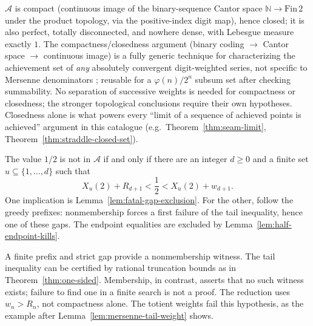 \begin{prop}
\label{prop:achievement-set-topology}
$\ensuremath{\mathcal A}$ is compact (continuous image of the binary-sequence
Cantor space $\mathbb N\to\mathrm{Fin}\,2$ under the product topology, via
the positive-index digit map), hence closed; it is also perfect, totally
disconnected, and nowhere dense, with Lebesgue measure exactly $1$. The
compactness/closedness argument (binary coding $\to$ Cantor space $\to$ continuous image)
is a fully generic technique for characterizing the achievement set of \emph{any}
absolutely convergent digit-weighted series, not specific to Mersenne denominators ;
reusable for a $\varphi(n)/2^n$ subsum set after checking summability.
No separation of successive weights is needed for compactness or
closedness; the stronger topological conclusions require their own
hypotheses. Closedness alone is what powers every ``limit of a sequence of
achieved points is achieved'' argument in this catalogue (e.g.\
Theorem~\ref{thm:seam-limit}, Theorem~\ref{thm:straddle-closed-set}).
\end{prop}

\begin{thm}
\label{thm:master-dichotomy}
The value $1/2$ is not in $\mathcal A$ if and only if there are
an integer $d\ge0$ and a finite set $u\subseteq\{1,\ldots,d\}$
such that
\[
 X_u(2)+R_{d+1}<\frac12<X_u(2)+w_{d+1}.
\]
One implication is Lemma~\ref{lem:fatal-gap-exclusion}.  For the
other, follow the greedy prefixes: nonmembership forces a first
failure of the tail inequality, hence one of these gaps.
The endpoint equalities are excluded by
Lemma~\ref{lem:half-endpoint-kills}.

A finite prefix and strict gap provide a nonmembership witness.
The tail inequality can be certified by rational truncation bounds
as in Theorem~\ref{thm:one-sided}.  Membership, in contrast, asserts
that no such witness exists; failure to find one in a finite search
is not a proof.  The reduction uses $w_n>R_n$, not compactness
alone.  The totient weights fail this hypothesis, as the example
after Lemma~\ref{lem:mersenne-tail-weight} shows.
\end{thm}

